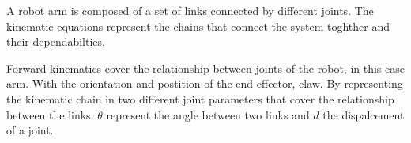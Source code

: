 A robot arm is composed of a set of links connected by different joints.
 The kinematic equations represent the chains that connect the system toghther and their dependabilties. %


Forward kinematics cover the relationship between joints of the robot, in this case arm. 
With the orientation and postition of the end effector, claw.  %
By representing the kinematic chain in two different joint parameters that cover the relationship between the links.
$\theta$ represent the angle between two links and $d$ the dispalcement of a joint.